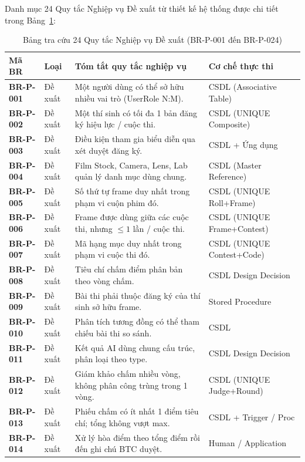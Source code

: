 Danh mục 24 Quy tắc Nghiệp vụ Đề xuất từ thiết kế hệ thống được chi tiết trong Bảng~\ref{tab:a_br_proposed}:

\begin{table}[!ht]
\centering
\caption{Bảng tra cứu 24 Quy tắc Nghiệp vụ Đề xuất (BR-P-001 đến BR-P-024)}
\label{tab:a_br_proposed}
\scriptsize
\begin{tabularx}{\textwidth}{p{1.8cm}p{1.6cm}>{\raggedright\arraybackslash}Xp{3.4cm}}
\toprule
\textbf{Mã BR} & \textbf{Loại} & \textbf{Tóm tắt quy tắc nghiệp vụ} & \textbf{Cơ chế thực thi} \\
\midrule
\textbf{BR-P-001} & Đề xuất & Một người dùng có thể sở hữu nhiều vai trò (UserRole N:M). & CSDL (Associative Table) \\
\textbf{BR-P-002} & Đề xuất & Một thí sinh có tối đa 1 bản đăng ký hiệu lực / cuộc thi. & CSDL (UNIQUE Composite) \\
\textbf{BR-P-003} & Đề xuất & Điều kiện tham gia biểu diễn qua xét duyệt đăng ký. & CSDL + Ứng dụng \\
\textbf{BR-P-004} & Đề xuất & Film Stock, Camera, Lens, Lab quản lý danh mục dùng chung. & CSDL (Master Reference) \\
\textbf{BR-P-005} & Đề xuất & Số thứ tự frame duy nhất trong phạm vi cuộn phim đó. & CSDL (UNIQUE Roll+Frame) \\
\textbf{BR-P-006} & Đề xuất & Frame được dùng giữa các cuộc thi, nhưng $\leq 1$ lần / cuộc thi. & CSDL (UNIQUE Frame+Contest) \\
\textbf{BR-P-007} & Đề xuất & Mã hạng mục duy nhất trong phạm vi cuộc thi đó. & CSDL (UNIQUE Contest+Code) \\
\textbf{BR-P-008} & Đề xuất & Tiêu chí chấm điểm phân bản theo vòng chấm. & CSDL Design Decision \\
\textbf{BR-P-009} & Đề xuất & Bài thi phải thuộc đăng ký của thí sinh sở hữu frame. & Stored Procedure \\
\textbf{BR-P-010} & Đề xuất & Phân tích tương đồng có thể tham chiếu bài thi so sánh. & CSDL \\
\textbf{BR-P-011} & Đề xuất & Kết quả AI dùng chung cấu trúc, phân loại theo type. & CSDL Design Decision \\
\textbf{BR-P-012} & Đề xuất & Giám khảo chấm nhiều vòng, không phân công trùng trong 1 vòng. & CSDL (UNIQUE Judge+Round) \\
\textbf{BR-P-013} & Đề xuất & Phiếu chấm có ít nhất 1 điểm tiêu chí; tổng không vượt max. & CSDL + Trigger / Proc \\
\textbf{BR-P-014} & Đề xuất & Xử lý hòa điểm theo tổng điểm rồi đến ghi chú BTC duyệt. & Human / Application \\

\end{tabularx}
\end{table}
